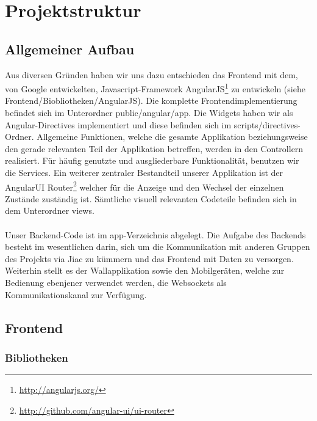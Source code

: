 \documentclass[10pt,a4paper]{report}
\newcommand{\code}[1]{{\fontfamily{cmvtt}\selectfont #1}}
\begin{document}
	\section{Projektstruktur}
		\subsection{Allgemeiner Aufbau}
			Aus diversen Gründen haben wir uns dazu entschieden das Frontend mit dem, von Google entwickelten, Javascript-Framework AngularJS\footnote{\href{http://angularjs.org/}{http://angularjs.org/}} zu entwickeln (siehe Frontend/Biobliotheken/AngularJS). Die komplette Frontendimplementierung befindet sich im Unterordner \code{public/angular/app}. Die Widgets haben wir als Angular-Directives implementiert und diese befinden sich im \code{scripts/directives}-Ordner. Allgemeine Funktionen, welche die gesamte Applikation beziehungsweise den gerade relevanten Teil der Applikation betreffen, werden in den Controllern realisiert. Für häufig genutzte und ausgliederbare Funktionalität, benutzen wir die Services. Ein weiterer zentraler Bestandteil unserer Applikation ist der AngularUI Router\footnote{\href{http://github.com/angular-ui/ui-router}{http://github.com/angular-ui/ui-router}} welcher für die Anzeige und den Wechsel der einzelnen Zustände zuständig ist. Sämtliche visuell relevanten Codeteile befinden sich in dem Unterordner \code{views}.\\\\
			Unser Backend-Code ist im \code{app}-Verzeichnis abgelegt. Die Aufgabe des Backends  besteht im wesentlichen darin, sich um die Kommunikation mit anderen Gruppen des Projekts via Jiac zu kümmern und das Frontend mit Daten zu versorgen. Weiterhin stellt es der Wallapplikation sowie den Mobilgeräten, welche zur Bedienung ebenjener verwendet werden, die Websockets als Kommunikationskanal zur Verfügung.

		\subsection{Frontend}
			\subsubsection{Bibliotheken}
\end{document}
